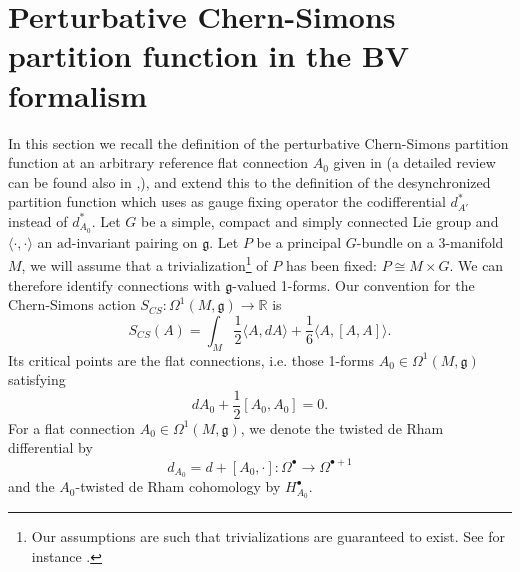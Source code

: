 \documentclass[11pt,a4paper]{amsart}
\theoremstyle{plain} %
\theoremstyle{definition}
\theoremstyle{remark}
\newcommand{\R}{\mathbb{R}}
\newcommand{\g}{\mathfrak{g}}
\newcommand{\dd}{d}
\newcommand{\bt}{\bullet}
\begin{document}
{\section{Perturbative Chern-Simons partition function in the BV formalism}
In this section we recall the definition of the perturbative Chern-Simons partition function at an arbitrary reference flat connection $A_0$ given in \cite{Cattaneo2008} (a detailed review can be found also in \cite{mnev2019quantum},\cite{Wernli2022}), and extend this to the definition of the desynchronized partition function which uses as gauge fixing operator the codifferential $d^*_{A'}$ instead of $d^*_{A_0}$. Let $G$ be a simple, compact and simply connected Lie group and $\langle\cdot,\cdot\rangle$ an $\mathrm{ad}$-invariant pairing on $\g$. Let $P$ be a principal $G$-bundle on a 3-manifold $M$, we will assume that a trivialization\footnote{Our assumptions are such that trivializations are guaranteed to exist. See for instance \cite{Freed1995}.} of $P$ has been fixed: $P \cong M \times G$. We can therefore identify connections with $\g$-valued 1-forms. Our convention for the Chern-Simons action $S_{CS} \colon \Omega^1(M,\g) \to \R$ is 
\begin{equation}\label{S_CS in sec3}
    S_{CS}(A) = \int_M \frac12 \langle A, \dd A\rangle + \frac16\langle A,[A,A]\rangle.
\end{equation}
Its critical points are the flat connections, i.e. those 1-forms $A_0 \in \Omega^1(M,\g)$ satisfying 
\begin{equation}
    dA_0 + \frac{1}{2}[A_0,A_0] = 0.
\end{equation}
For a flat connection $A_0 \in \Omega^1(M,\g)$, we denote the twisted de Rham differential by 
\begin{equation}
    d_{A_0} = d + [A_0,\cdot] \colon \Omega^\bullet \to \Omega^{\bullet + 1}
\end{equation}
and the $A_0$-twisted de Rham cohomology by 
$H_{A_0}^\bt$.


}
\end{document}
